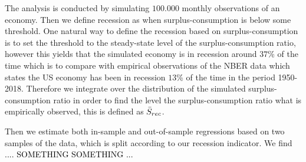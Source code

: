 The analysis is conducted by simulating $100.000$ monthly observations of an economy. Then we define recession as when surplus-consumption is below some threshold. One natural way to define the recession based on surplus-consumption is to set the threshold to the steady-state level of the surplus-consumption ratio, however this yields that the simulated economy is in recession around $37$\% of the time which is to compare with empirical observations of the NBER data which states the US economy has been in recession $13$\% of the time in the period 1950-2018. Therefore we integrate over the distribution of the simulated surplus-consumption ratio in order to find the level the surplus-consumption ratio what is empirically observed, this is defined as $\Bar{S}_{rec}$. 

Then we estimate both in-sample and out-of-sample regressions based on two samples of the data, which is split according to our recession indicator. We find \colorbox{yellow!100}{\textcolor{black}{.... SOMETHING SOMETHING ...}}







